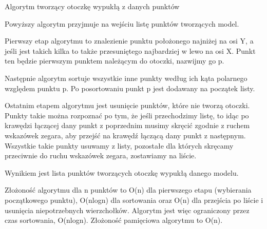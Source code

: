 \begin{algorithm}[H]
	\caption{Algorytm tworzący otoczkę wypukłą z danych punktów}
\end{algorithm}\bigskip

\noindent Powyższy algorytm przyjmuje na wej\'sciu listę punktów tworzących model.

Pierwszy etap algorytmu to znalezienie punktu położonego najniżej na osi Y, a je\'sli jest takich kilka to także przesuniętego najbardziej w lewo na osi X. Punkt ten będzie pierwszym punktem należącym do otoczki, nazwijmy go p.

Następnie algorytm sortuje wszystkie inne punkty według ich kąta polarnego względem punktu p. Po posortowaniu punkt p jest dodawany na początek listy.

Ostatnim etapem algorytmu jest usunięcie punktów, które nie tworzą otoczki. Punkty takie można rozpoznać po tym, że je\'sli przechodzimy listę, to idąc po krawędzi łączącej dany punkt z poprzednim musimy skręcić zgodnie z ruchem wskazówek zegara, aby przej\'sć na krawędź łączącą dany punkt z następnym. Wszystkie takie punkty usuwamy z listy, pozostałe dla których skręcamy przeciwnie do ruchu wskazówek zegara, zostawiamy na li\'scie.

Wynikiem jest lista punktów tworzących otoczkę wypukłą danego modelu.


Złożono\'sć algorytmu dla n punktów to O(n) dla pierwszego etapu (wybierania początkowego punktu), O(nlogn) dla sortowania oraz O(n) dla przej\'scia po li\'scie i usunięcia niepotrzebnych wierzchołków. Algorytm jest więc ograniczony przez czas sortowania, O(nlogn). Złożono\'sć pamięciowa algorytmu to O(n).

